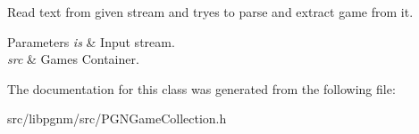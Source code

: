 Read text from given stream and tryes to parse and extract game from it. 


\begin{DoxyParams}{Parameters}
{\em is} & Input stream. \\
\hline
{\em src} & Games Container. \\
\hline
\end{DoxyParams}


The documentation for this class was generated from the following file:\begin{DoxyCompactItemize}
\item 
src/libpgnm/src/PGNGameCollection.h\end{DoxyCompactItemize}
